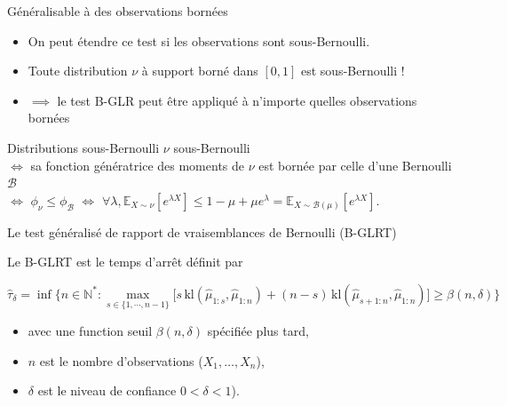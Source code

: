 \documentclass[11pt,french,ignorenonframetext,]{beamer}
\providecommand{\tightlist}{%
  \setlength{\itemsep}{0pt}\setlength{\parskip}{0pt}}
\begin{document}
\begin{frame}{Généralisable à des observations bornées \dCooley{}}

  \begin{itemize}
    \item
    On peut étendre ce test si les observations sont \alert{sous-Bernoulli}.
    \item
    Toute distribution $\nu$ à support borné dans $[0,1]$ est sous-Bernoulli !
    \item
    $\implies$ le test B-GLR peut être appliqué à n'importe quelles observations bornées \dCooley{}
  \end{itemize}

  \begin{small}
  \begin{exampleblock}{Distributions sous-Bernoulli}
    $\nu$ sous-Bernoulli \\
    $\Leftrightarrow$
    sa fonction génératrice des moments de $\nu$ est bornée par celle d'une Bernoulli $\mathcal{B}$ \\
    $\Leftrightarrow$
    $\phi_{\nu} \leq \phi_{\mathcal{B}}$
    $\Leftrightarrow$
    $\forall \lambda, \mathbb{E}_{X\sim\nu}\left[e^{\lambda X}\right] \leq  1-\mu + \mu e^\lambda = \mathbb{E}_{X\sim \mathcal{B}(\mu)} [e^{\lambda X}]$.
  \end{exampleblock}
\end{small}

\end{frame}

\begin{frame}{Le test généralisé de rapport de vraisemblances de Bernoulli (B-GLRT)}

    Le \alert{B-GLRT} est le temps d'arrêt définit par
    \begin{small}
    \[ \widehat{\tau}_{\delta} = \inf \bigl\{ n \in \mathbb{N}^* : \max_{s \in \{1,\cdots,n-1\}} \bigl[s \, \mathrm{kl}\left(\widehat{\mu}_{1:s},\widehat{\mu}_{1:n}\right) + (n-s) \, \mathrm{kl}\left(\widehat{\mu}_{s+1:n},\widehat{\mu}_{1:n}\right)\bigr] \geq \beta(n,\delta) \bigr\} \]
    \vspace*{-10pt}
    \end{small}%
    \begin{itemize}\tightlist
      \item avec une \alert{function seuil} $\beta(n,\delta)$ spécifiée plus tard,
      \item $n$ est le nombre d'observations ($X_1,\dots,X_n$),
      \item $\delta$ est le niveau de confiance $0 < \delta < 1$).
    \end{itemize}%

\end{frame}
\end{document}
